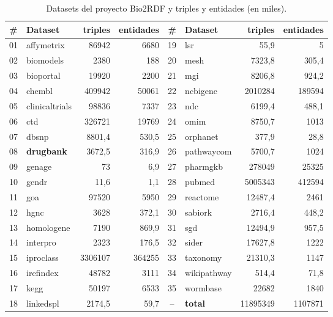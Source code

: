 \begin{table}[]
\centering
\begin{tabular}{|c|l|r|r||c|l|r|r|}
  \hline
  \bf{\#} & \bf{Dataset} & \bf{triples} & \bf{entidades} &
  \bf{\#} & \bf{Dataset} & \bf{triples} & \bf{entidades} \\\hline
  01 & affymetrix     &   86942 &   6680 & 19 & lsr         &     55,9 &       5\\\hline
  02 & biomodels      &    2380 &    188 & 20 & mesh        &   7323,8 &   305,4\\\hline
  03 & bioportal      &   19920 &   2200 & 21 & mgi         &   8206,8 &   924,2\\\hline
  04 & chembl         &  409942 &  50061 & 22 & ncbigene    &  2010284 &  189594\\\hline
  05 & clinicaltrials &   98836 &   7337 & 23 & ndc         &   6199,4 &   488,1\\\hline
  06 & ctd            &  326721 &  19769 & 24 & omim        &   8750,7 &    1013\\\hline
  07 & dbsnp          &  8801,4 &  530,5 & 25 & orphanet    &    377,9 &    28,8\\\hline
  08 & \bf{drugbank}  &  3672,5 &  316,9 & 26 & pathwaycom  &   5700,7 &    1024\\\hline
  09 & genage         &      73 &    6,9 & 27 & pharmgkb    &   278049 &   25325\\\hline
  10 & gendr          &    11,6 &    1,1 & 28 & pubmed      &  5005343 &  412594\\\hline
  11 & goa            &   97520 &   5950 & 29 & reactome    &  12487,4 &    2461\\\hline
  12 & hgnc           &    3628 &  372,1 & 30 & sabiork     &   2716,4 &   448,2\\\hline
  13 & homologene     &    7190 &  869,9 & 31 & sgd         &  12494,9 &   957,5\\\hline
  14 & interpro       &    2323 &  176,5 & 32 & sider       &  17627,8 &    1222\\\hline
  15 & iproclass      & 3306107 & 364255 & 33 & taxonomy    &  21310,3 &    1147\\\hline
  16 & irefindex      &   48782 &   3111 & 34 & wikipathway &    514,4 &    71,8\\\hline
  17 & kegg           &   50197 &   6533 & 35 & wormbase    &    22682 &    1840\\\hline
  18 & linkedspl      &  2174,5 &   59,7 & -- & \bf{total}  & 11895349 & 1107871\\\hline
\end{tabular}
\caption{Datasets del proyecto Bio2RDF y triples y entidades (en miles).}
\label{tab:bio2RDFdataset}
\end{table}
